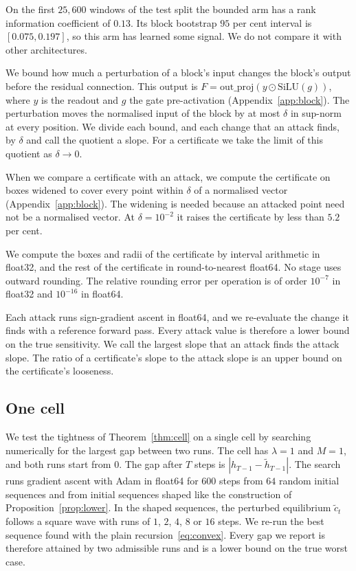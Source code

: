 \documentclass[11pt, a4paper]{article}
\theoremstyle{remark}
\theoremstyle{plain}
\begin{document}
On the first $25{,}600$ windows of the test split the bounded arm has a rank information
coefficient of $0.13$. Its block
bootstrap $95$ per cent interval is $[0.075, 0.197]$, so this arm has learned some signal. We do
not compare it with other architectures.

We bound how much a perturbation of a block's input changes the block's output before the residual
connection. This output is $F = \mathrm{out\_proj}(y \odot \mathrm{SiLU}(g))$, where $y$ is the
readout and $g$ the gate pre-activation (Appendix~\ref{app:block}). The perturbation moves the
normalised input of the block by at most $\delta$ in sup-norm at every position. We divide each
bound, and each change that an attack finds, by $\delta$ and call the quotient a slope. For a
certificate we take the limit of this quotient as $\delta \to 0$.

When we compare a certificate with an attack, we compute the certificate on boxes widened to cover
every point within $\delta$ of a normalised vector (Appendix~\ref{app:block}). The widening is
needed because an attacked point need not be a normalised vector. At $\delta = 10^{-2}$ it raises
the certificate by less than $5.2$ per cent.

We compute the boxes and radii of the certificate by interval arithmetic in float32, and the rest
of the certificate in round-to-nearest float64. No stage uses outward rounding. The relative
rounding error per operation is of order $10^{-7}$ in float32 and $10^{-16}$ in float64.

Each attack runs sign-gradient ascent in float64, and we re-evaluate the change it finds with a
reference forward pass. Every attack value is therefore a lower bound on the true sensitivity. We
call the largest slope that an attack finds the attack slope. The ratio of a certificate's slope to
the attack slope is an upper bound on the certificate's looseness.

\subsection{One cell}
\label{sec:one-cell}

We test the tightness of Theorem~\ref{thm:cell} on a single cell by searching numerically for the
largest gap between two runs. The cell has $\lambda = 1$ and $M = 1$, and both runs start from
$0$. The gap after $T$ steps is $|h_{T-1} - \tilde h_{T-1}|$. The search runs gradient ascent with
Adam in float64 for $600$ steps from $64$ random initial sequences and from initial sequences
shaped like the construction of Proposition~\ref{prop:lower}. In the shaped sequences, the
perturbed equilibrium $\tilde c_t$ follows a square wave with runs of $1$, $2$, $4$, $8$ or $16$
steps. We re-run
the best sequence found with the plain recursion~\eqref{eq:convex}. Every gap we report is
therefore attained by two admissible runs and is a lower bound on the true worst case.
\end{document}
